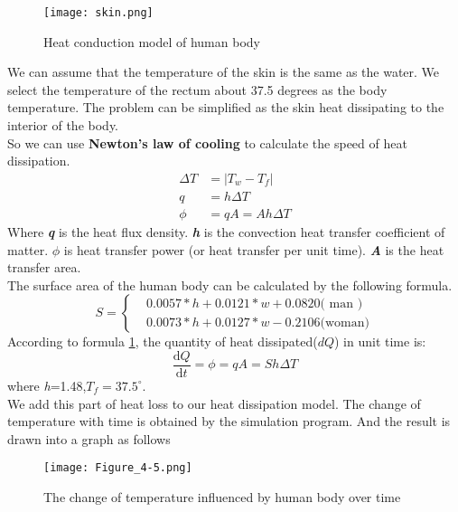 \documentclass{mcmthesis}
\begin{document}
\begin{figure}[H]
\centerline{\texttt{[image: skin.png]}}
\caption{Heat conduction model of human body}
\label{skin}
\end{figure}
\indent We can assume that the temperature of the skin is the same as the water. We select the temperature of the rectum about 37.5 degrees as the body temperature. The problem can be simplified as the skin heat dissipating to the interior of the body.\\
\indent So we can use {\bf Newton's law of cooling} to calculate the speed of heat dissipation.\\
\begin{equation}
\begin{split}
\Delta T&=|T_{w}-T_{f}| \\
q&=h\Delta T	\\
\phi &=qA=Ah\Delta T
\end{split}
\end{equation}
\indent Where \textbf{\emph{q}} is the heat flux density. \textbf{\emph{h}} is the convection heat transfer coefficient of matter. \textbf{\emph{$\phi$}}  is heat transfer power (or heat transfer per unit time). \textbf{\emph{A}} is the heat transfer area.\\
\indent The surface area of the human body can be calculated by the following formula.
\begin{equation}
S= \begin{cases} & 0.0057*h+0.0121*w+0.0820\text{( man )} \\ & 0.0073*h+0.0127*w-0.2106\text{(woman)} \end{cases}
\label{s}
\end{equation}
\indent According to formula \ref{skin}, the quantity of heat dissipated($dQ$) in unit time is:
\begin{equation}
	\frac{\mathrm{d} Q}{\mathrm{d} t}=\phi =qA=Sh\Delta T
	\label{Q_skin}
\end{equation}
where \emph{h}=1.48,${T_{f}}=37.5^{\circ}$. \\
\indent We add this part of heat loss to our heat dissipation model. The change of temperature with time is obtained by the simulation program. And the result is drawn into a graph as follows
\begin{figure}[H]
	\centerline{\texttt{[image: Figure\_4-5.png]}}
	\caption{The change of temperature influenced by human body over time}
	\label{s_person}	
\end{figure}
\end{document}
